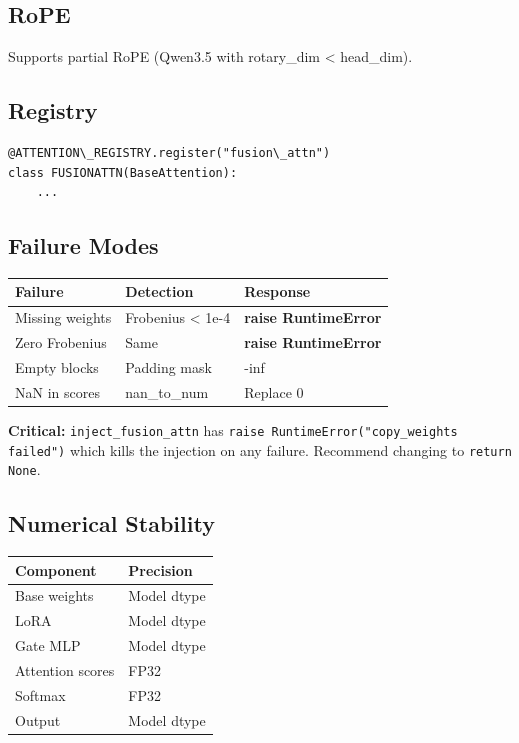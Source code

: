 \subsection{RoPE}

Supports partial RoPE (Qwen3.5 with rotary\_dim \textless{} head\_dim).

\subsection{Registry}

\begin{lstlisting}
@ATTENTION\_REGISTRY.register("fusion\_attn")
class FUSIONATTN(BaseAttention):
    ...
\end{lstlisting}

\subsection{Failure Modes}

\begin{table}[H]
\centering
\small
\begin{tabular}{lll}
\toprule
\textbf{Failure} & \textbf{Detection} & \textbf{Response} \\
\midrule
Missing weights & Frobenius \textless{} 1e-4 & \textbf{raise RuntimeError} \\
Zero Frobenius & Same & \textbf{raise RuntimeError} \\
Empty blocks & Padding mask & -inf \\
NaN in scores & nan\_to\_num & Replace 0 \\
\bottomrule
\end{tabular}
\end{table}

\textbf{   Critical:} \texttt{inject\_fusion\_attn} has \texttt{raise RuntimeError("copy\_weights failed")} 
which kills the injection on any failure. Recommend changing to \texttt{return None}.

\subsection{Numerical Stability}

\begin{table}[H]
\centering
\small
\begin{tabular}{ll}
\toprule
\textbf{Component} & \textbf{Precision} \\
\midrule
Base weights & Model dtype \\
LoRA & Model dtype \\
Gate MLP & Model dtype \\
Attention scores & FP32 \\
Softmax & FP32 \\
Output & Model dtype \\
\bottomrule
\end{tabular}
\end{table}



